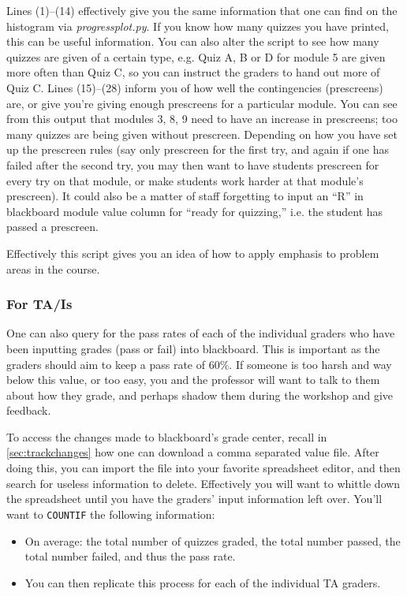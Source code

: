 \documentclass[12pt]{article}
\begin{document}
\indent Lines (1)--(14) effectively give you the same information that one can find on the histogram via \emph{progressplot.py}. If you know how many quizzes you have printed, this can be useful information. You can also alter the script to see how many quizzes are given of a certain type, e.g. Quiz A, B or D for module 5 are given more often than Quiz C, so you can instruct the graders to hand out more of Quiz C. Lines (15)--(28) inform you of how well the contingencies (prescreens) are, or give you're giving enough prescreens for a particular module. You can see from this output that modules 3, 8, 9 need to have an increase in prescreens; too many quizzes are being given without prescreen. Depending on how you have set up the prescreen rules (say only prescreen for the first try, and again if one has failed after the second try, you may then want to have students prescreen for every try on that module, or make students work harder at that module's prescreen). It could also be a matter of staff forgetting to input an ``R'' in blackboard module value column for ``ready for quizzing,'' i.e. the student has passed a prescreen. 

\indent Effectively this script gives you an idea of how to apply emphasis to problem areas in the course.


\subsubsection{For TA/Is} \label{sec:ft}

\noindent One can also query for the pass rates of each of the individual graders who have been inputting grades (pass or fail) into blackboard. This is important as the graders should aim to keep a pass rate of 60\%. If someone is too harsh and way below this value, or too easy, you and the professor will want to talk to them about how they grade, and perhaps shadow them during the workshop and give feedback.

\indent To access the changes made to blackboard's grade center, recall in \ref{sec:trackchanges} how one can download a comma separated value file. After doing this, you can import the file into your favorite spreadsheet editor, and then search for useless information to delete. Effectively you will want to whittle down the spreadsheet until you have the graders' input information left over. You'll want to \texttt{COUNTIF} the following information:

\begin{itemize}
	\item On average: the total number of quizzes graded, the total number passed, the total number failed, and thus the pass rate.
	\item You can then replicate this process for each of the individual TA graders.
\end{itemize}
\end{document}
